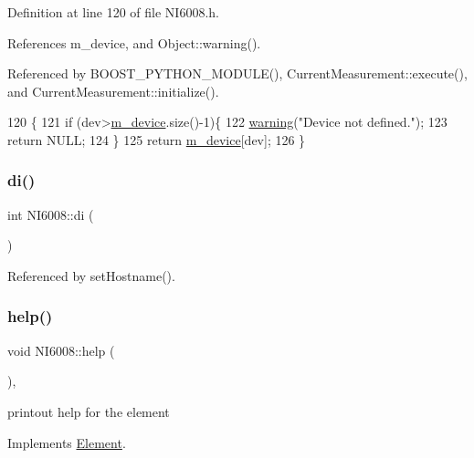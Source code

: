Definition at line 120 of file N\+I6008.\+h.



References m\+\_\+device, and Object\+::warning().



Referenced by B\+O\+O\+S\+T\+\_\+\+P\+Y\+T\+H\+O\+N\+\_\+\+M\+O\+D\+U\+L\+E(), Current\+Measurement\+::execute(), and Current\+Measurement\+::initialize().


\begin{DoxyCode}
120                                         \{
121     \textcolor{keywordflow}{if} (dev>\hyperlink{classNI6008_ac7225d517d42b1b7553dc75dccb29b58}{m\_device}.size()-1)\{
122       \hyperlink{classObject_a65cd4fda577711660821fd2cd5a3b4c9}{warning}(\textcolor{stringliteral}{"Device not defined."});
123       \textcolor{keywordflow}{return} NULL;
124     \}
125     \textcolor{keywordflow}{return} \hyperlink{classNI6008_ac7225d517d42b1b7553dc75dccb29b58}{m\_device}[dev];
126   \}
\end{DoxyCode}
\mbox{\label{classNI6008_a570edfad9c7a246a8ade767092c5fcbc}} 
\subsubsection{\texorpdfstring{di()}{di()}}
{\footnotesize\ttfamily int N\+I6008\+::di (\begin{DoxyParamCaption}{ }\end{DoxyParamCaption})}



Referenced by set\+Hostname().

\mbox{\label{classNI6008_ab58d458dbd895b97f7aa51c52b5cd714}} 
\subsubsection{\texorpdfstring{help()}{help()}}
{\footnotesize\ttfamily void N\+I6008\+::help (\begin{DoxyParamCaption}{ }\end{DoxyParamCaption})\hspace{0.3cm}{\ttfamily [inline]}, {\ttfamily [virtual]}}

printout help for the element 

Implements \hyperlink{classElement_a32c0de27acb08e17251cef88c3e9303a}{Element}.



